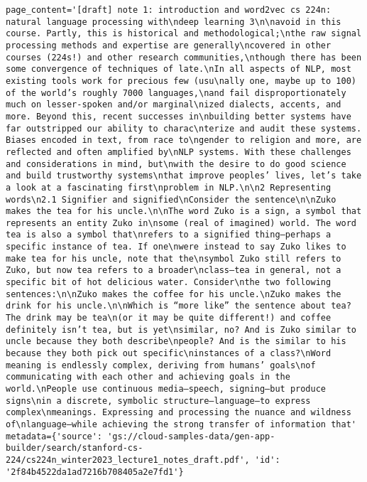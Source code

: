 \documentclass[
  letterpaper,
  DIV=11,
  numbers=noendperiod]{scrreprt}
\begin{document}
\begin{verbatim}
page_content='[draft] note 1: introduction and word2vec cs 224n: natural language processing with\ndeep learning 3\n\navoid in this course. Partly, this is historical and methodological;\nthe raw signal processing methods and expertise are generally\ncovered in other courses (224s!) and other research communities,\nthough there has been some convergence of techniques of late.\nIn all aspects of NLP, most existing tools work for precious few (usu\nally one, maybe up to 100) of the world’s roughly 7000 languages,\nand fail disproportionately much on lesser-spoken and/or marginal\nized dialects, accents, and more. Beyond this, recent successes in\nbuilding better systems have far outstripped our ability to charac\nterize and audit these systems. Biases encoded in text, from race to\ngender to religion and more, are reflected and often amplified by\nNLP systems. With these challenges and considerations in mind, but\nwith the desire to do good science and build trustworthy systems\nthat improve peoples’ lives, let’s take a look at a fascinating first\nproblem in NLP.\n\n2 Representing words\n2.1 Signifier and signified\nConsider the sentence\n\nZuko makes the tea for his uncle.\n\nThe word Zuko is a sign, a symbol that represents an entity Zuko in\nsome (real of imagined) world. The word tea is also a symbol that\nrefers to a signified thing—perhaps a specific instance of tea. If one\nwere instead to say Zuko likes to make tea for his uncle, note that the\nsymbol Zuko still refers to Zuko, but now tea refers to a broader\nclass—tea in general, not a specific bit of hot delicious water. Consider\nthe two following sentences:\n\nZuko makes the coffee for his uncle.\nZuko makes the drink for his uncle.\n\nWhich is “more like” the sentence about tea? The drink may be tea\n(or it may be quite different!) and coffee definitely isn’t tea, but is yet\nsimilar, no? And is Zuko similar to uncle because they both describe\npeople? And is the similar to his because they both pick out specific\ninstances of a class?\nWord meaning is endlessly complex, deriving from humans’ goals\nof communicating with each other and achieving goals in the world.\nPeople use continuous media—speech, signing—but produce signs\nin a discrete, symbolic structure—language—to express complex\nmeanings. Expressing and processing the nuance and wildness of\nlanguage—while achieving the strong transfer of information that' metadata={'source': 'gs://cloud-samples-data/gen-app-builder/search/stanford-cs-224/cs224n_winter2023_lecture1_notes_draft.pdf', 'id': '2f84b4522da1ad7216b708405a2e7fd1'}

\end{verbatim}
\end{document}
